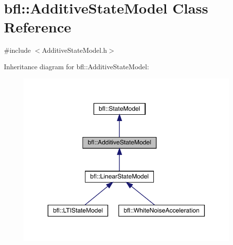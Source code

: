 \hypertarget{classbfl_1_1AdditiveStateModel}{}\section{bfl\+:\+:Additive\+State\+Model Class Reference}
\label{classbfl_1_1AdditiveStateModel}


{\ttfamily \#include $<$Additive\+State\+Model.\+h$>$}



Inheritance diagram for bfl\+:\+:Additive\+State\+Model\+:
\nopagebreak
\begin{figure}[H]
\begin{center}
\leavevmode
\includegraphics[width=332pt]{classbfl_1_1AdditiveStateModel__inherit__graph}
\end{center}
\end{figure}
